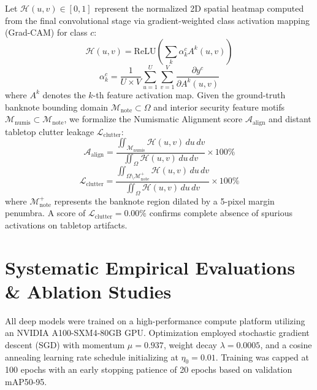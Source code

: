 \documentclass[conference]{IEEEtran}
\begin{document}
Let $\mathcal{H}(u,v) \in [0, 1]$ represent the normalized 2D spatial heatmap computed from the final convolutional stage via gradient-weighted class activation mapping (Grad-CAM) \cite{selvaraju2017grad} for class $c$:
\begin{equation}
    \mathcal{H}(u,v) = \text{ReLU}\left( \sum_{k} \alpha_k^c A^k(u,v) \right)
\end{equation}
\begin{equation}
    \alpha_k^c = \frac{1}{U \times V} \sum_{u=1}^U \sum_{v=1}^V \frac{\partial y^c}{\partial A^k(u,v)}
\end{equation}
where $A^k$ denotes the $k$-th feature activation map. Given the ground-truth banknote bounding domain $\mathcal{M}_{\text{note}} \subset \Omega$ and interior security feature motifs $\mathcal{M}_{\text{numis}} \subset \mathcal{M}_{\text{note}}$, we formalize the Numismatic Alignment score $\mathcal{A}_{\text{align}}$ and distant tabletop clutter leakage $\mathcal{L}_{\text{clutter}}$:
\begin{equation}
    \mathcal{A}_{\text{align}} = \frac{\iint_{\mathcal{M}_{\text{numis}}} \mathcal{H}(u,v) \, du \, dv}{\iint_{\Omega} \mathcal{H}(u,v) \, du \, dv} \times 100\%
    \label{eq:alignment_score}
\end{equation}
\begin{equation}
    \mathcal{L}_{\text{clutter}} = \frac{\iint_{\Omega \setminus \mathcal{M}_{\text{note}}^{+}} \mathcal{H}(u,v) \, du \, dv}{\iint_{\Omega} \mathcal{H}(u,v) \, du \, dv} \times 100\%
    \label{eq:leakage_score}
\end{equation}
where $\mathcal{M}_{\text{note}}^{+}$ represents the banknote region dilated by a 5-pixel margin penumbra. A score of $\mathcal{L}_{\text{clutter}} = 0.00\%$ confirms complete absence of spurious activations on tabletop artifacts.

\section{Systematic Empirical Evaluations \& Ablation Studies}
\label{sec:experiments}

All deep models were trained on a high-performance compute platform utilizing an NVIDIA A100-SXM4-80GB GPU. Optimization employed stochastic gradient descent (SGD) with momentum $\mu = 0.937$, weight decay $\lambda = 0.0005$, and a cosine annealing learning rate schedule initializing at $\eta_0 = 0.01$. Training was capped at 100 epochs with an early stopping patience of 20 epochs based on validation mAP50-95.
\end{document}
